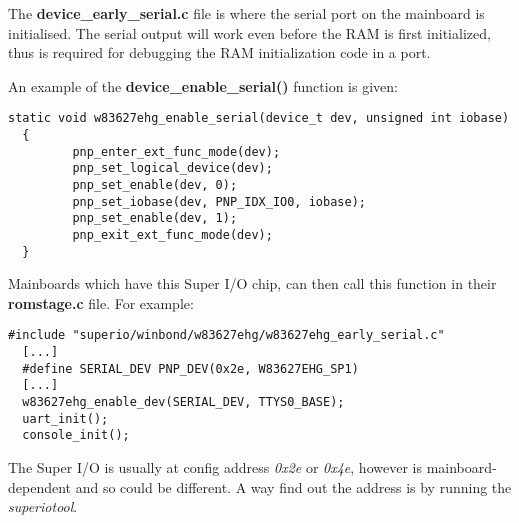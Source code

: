The \textbf{device\_early\_serial.c} file is where the serial port on the
mainboard is initialised. The serial output will work even before the RAM is
first initialized, thus is required for debugging the RAM initialization
code in a port.

An example of the \textbf{device\_enable\_serial()} function is given:

\begin{lstlisting}[caption=The \textbf{device\_enable\_serial()} function.]
  static void w83627ehg_enable_serial(device_t dev, unsigned int iobase)
  {
         pnp_enter_ext_func_mode(dev);
         pnp_set_logical_device(dev);
         pnp_set_enable(dev, 0);
         pnp_set_iobase(dev, PNP_IDX_IO0, iobase);
         pnp_set_enable(dev, 1);
         pnp_exit_ext_func_mode(dev);
  }
\end{lstlisting}

Mainboards which have this Super I/O chip, can then call this function in their
\textbf{romstage.c} file. For example:

\begin{lstlisting}[caption=The \textbf{romstage.c} file.]
  #include "superio/winbond/w83627ehg/w83627ehg_early_serial.c"
  [...]
  #define SERIAL_DEV PNP_DEV(0x2e, W83627EHG_SP1)
  [...]
  w83627ehg_enable_dev(SERIAL_DEV, TTYS0_BASE);
  uart_init();
  console_init();
\end{lstlisting}

\begin{rem}
  The Super I/O is usually at config address \emph{0x2e} or \emph{0x4e},
  however is mainboard-dependent and so could be different. A way find out the
  address is by running the \emph{superiotool}.
\end{rem}
